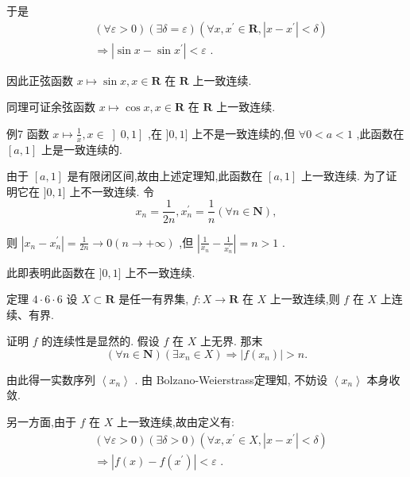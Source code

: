 于是
\begin{align*}
	&\left( {\forall \varepsilon  > 0}\right) \left( {\exists \delta  = \varepsilon }\right) \left( {\forall x,{x}^{\prime } \in  \mathbf{R},\left| {x - {x}^{\prime }}\right|  < \delta }\right)\\
	&\Rightarrow  \left| {\sin x - \sin {x}^{\prime }}\right|  < \varepsilon \text{ . }
\end{align*}

因此正弦函数 $x \mapsto  \sin x,x \in  \mathbf{R}$ 在 $\mathbf{R}$ 上一致连续.

同理可证余弦函数 $x \mapsto  \cos x,x \in  \mathbf{R}$ 在 $\mathbf{R}$ 上一致连续.

例7 函数 $x \mapsto  \frac{1}{x},x \in  \left\rbrack  {0,1}\right\rbrack$ ,在 $\rbrack 0,1\rbrack$ 上不是一致连续的,但 $\forall 0 < a < 1$ ,此函数在 $\left\lbrack  {a,1}\right\rbrack$ 上是一致连续的.

由于 $\left\lbrack  {a,1}\right\rbrack$ 是有限闭区间,故由上述定理知,此函数在 $\left\lbrack  {a,1}\right\rbrack$ 上一致连续. 为了证明它在 $\rbrack 0,1\rbrack$ 上不一致连续. 令
$${x}_{n} = \frac{1}{2n},{x}_{n}^{\prime } = \frac{1}{n}\left( {\forall n \in  \mathbf{N}}\right) ,$$

则 $\left| {{x}_{n} - {x}_{n}^{\prime }}\right|  = \frac{1}{2n} \rightarrow  0\left( {n \rightarrow   + \infty }\right)$ ,但 $\left| {\frac{1}{{x}_{n}} - \frac{1}{{x}_{n}^{\prime }}}\right|  = n > 1$ .

此即表明此函数在 $\rbrack 0,1\rbrack$ 上不一致连续.

定理 $4 \cdot  6 \cdot  6$ 设 $X \subset  \mathbf{R}$ 是任一有界集, $f : X \rightarrow  \mathbf{R}$ 在 $X$ 上一致连续,则 $f$ 在 $X$ 上连续、有界.

证明 $f$ 的连续性是显然的. 假设 $f$ 在 $X$ 上无界. 那末
$$\left( {\forall n \in  \mathbf{N}}\right) \left( {\exists {x}_{n} \in  X}\right)  \Rightarrow  \left| {f\left( {x}_{n}\right) }\right|  > n.$$

由此得一实数序列 $\left\langle  {x}_{n}\right\rangle$ . 由 Bolzano-Weierstrass定理知, 不妨设 $\left\langle  {x}_{n}\right\rangle$ 本身收敛.

另一方面,由于 $f$ 在 $X$ 上一致连续,故由定义有:
\begin{align*}
	&\left( {\forall \varepsilon  > 0}\right) \left( {\exists \delta  > 0}\right) \left( {\forall x,{x}^{\prime } \in  X,\left| {x - {x}^{\prime }}\right|  < \delta }\right)\\
	&\Rightarrow  \left| {f\left( x\right)  - f\left( {x}^{\prime }\right) }\right|  < \varepsilon \text{ . }
\end{align*}

